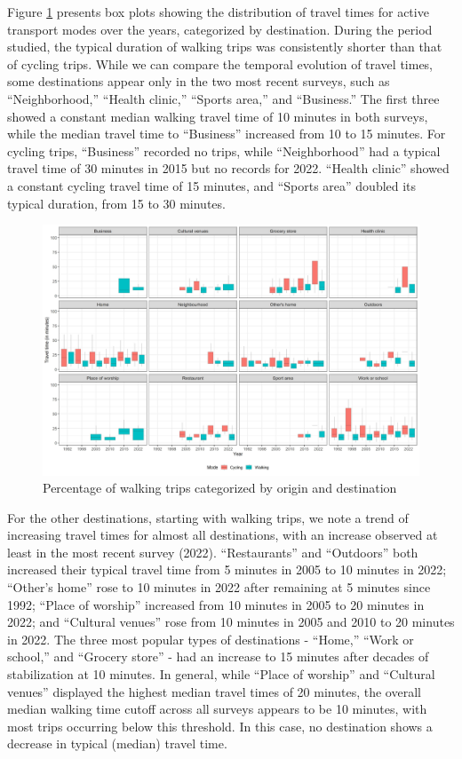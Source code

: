 \documentclass[preprint, 3p,
authoryear]{elsarticle} %
\begin{document}
Figure \ref{fig:figure-boxplot} presents box plots showing the
distribution of travel times for active transport modes over the years,
categorized by destination. During the period studied, the typical
duration of walking trips was consistently shorter than that of cycling
trips. While we can compare the temporal evolution of travel times, some
destinations appear only in the two most recent surveys, such as
``Neighborhood,'' ``Health clinic,'' ``Sports area,'' and ``Business.''
The first three showed a constant median walking travel time of 10
minutes in both surveys, while the median travel time to ``Business''
increased from 10 to 15 minutes. For cycling trips, ``Business''
recorded no trips, while ``Neighborhood'' had a typical travel time of
30 minutes in 2015 but no records for 2022. ``Health clinic'' showed a
constant cycling travel time of 15 minutes, and ``Sports area'' doubled
its typical duration, from 15 to 30 minutes.

\begin{figure}
\includegraphics[width=1\linewidth]{figures/destination_boxplots} \caption{Percentage of walking trips categorized by origin and destination}\label{fig:figure-boxplot}
\end{figure}

For the other destinations, starting with walking trips, we note a trend
of increasing travel times for almost all destinations, with an increase
observed at least in the most recent survey (2022). ``Restaurants'' and
``Outdoors'' both increased their typical travel time from 5 minutes in
2005 to 10 minutes in 2022; ``Other's home'' rose to 10 minutes in 2022
after remaining at 5 minutes since 1992; ``Place of worship'' increased
from 10 minutes in 2005 to 20 minutes in 2022; and ``Cultural venues''
rose from 10 minutes in 2005 and 2010 to 20 minutes in 2022. The three
most popular types of destinations - ``Home,'' ``Work or school,'' and
``Grocery store'' - had an increase to 15 minutes after decades of
stabilization at 10 minutes. In general, while ``Place of worship'' and
``Cultural venues'' displayed the highest median travel times of 20
minutes, the overall median walking time cutoff across all surveys
appears to be 10 minutes, with most trips occurring below this
threshold. In this case, no destination shows a decrease in typical
(median) travel time.
\end{document}

